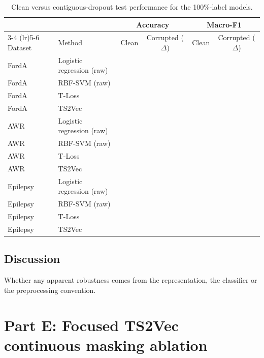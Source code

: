 \documentclass[a4paper,11pt]{article}
\newcommand{\TODOfill}{\todo[inline]{Fill in.}}
\begin{document}
\begin{table}[h]
    \centering
    \small
    \begin{tabular}{l l c c c c}
        \toprule
        & & \multicolumn{2}{c}{Accuracy} & \multicolumn{2}{c}{Macro-F1} \\
        \cmidrule(lr){3-4} \cmidrule(lr){5-6}
        Dataset & Method & Clean & Corrupted ($\Delta$) & Clean & Corrupted ($\Delta$) \\
        \midrule
        FordA & Logistic regression (raw) & & & & \\
        FordA & RBF-SVM (raw)             & & & & \\
        FordA & T-Loss                    & & & & \\
        FordA & TS2Vec                    & & & & \\
        \midrule
        AWR & Logistic regression (raw) & & & & \\
        AWR & RBF-SVM (raw)             & & & & \\
        AWR & T-Loss                    & & & & \\
        AWR & TS2Vec                    & & & & \\
        \midrule
        Epilepsy & Logistic regression (raw) & & & & \\
        Epilepsy & RBF-SVM (raw)             & & & & \\
        Epilepsy & T-Loss                    & & & & \\
        Epilepsy & TS2Vec                    & & & & \\
        \bottomrule
    \end{tabular}
    \caption{Clean versus contiguous-dropout test performance for the 100\%-label models.}
    \label{tab:dropout}
\end{table}

\subsection{Discussion}
Whether any apparent robustness comes from the representation, the classifier or the
preprocessing convention.
\TODOfill

\section{Part E: Focused TS2Vec continuous masking ablation}
\end{document}
